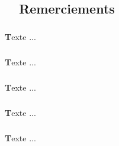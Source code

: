 \begin{titlepage}
\newpage
\pagestyle{fancy}      
\lhead{}  
\chead{}     
\rhead{}     
    
\renewcommand{\headrulewidth}{0.5pt}

\chapter*{\hrulefill ~~\textbf{Remerciements}~ \hrulefill}
\paragraph{}
\paragraph{}
\large

	  \textbf{T}exte ...
		
		\paragraph{}
			
		\textbf{T}exte ...
		
		\paragraph{}
		
		
		\textbf{T}exte ...
		
		\paragraph{}
		
		\textbf{T}exte ...
		
		\paragraph{}
		
		\textbf{T}exte ...

\thispagestyle{empty}		

\end{titlepage}	